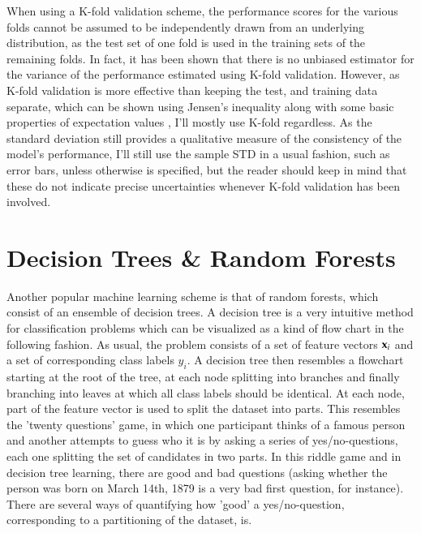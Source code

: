 When using a K-fold validation scheme, the performance scores for the various folds cannot be assumed to be independently drawn from an underlying distribution, as the test set of one fold is used in the training sets of the remaining folds. In fact, it has been shown \cite{Bengio2004} that there is no unbiased estimator for the variance of the performance estimated using K-fold validation. However, as K-fold validation is more effective than keeping the test, and training data separate, which can be shown using Jensen's inequality along with some basic properties of expectation values \cite{Blum1999}, I'll mostly use K-fold regardless. As the standard deviation still provides a qualitative measure of the consistency of the model's performance, I'll still use the sample STD in a usual fashion, such as error bars, unless otherwise is specified, but the reader should keep in mind that these do not indicate precise uncertainties whenever K-fold validation has been involved.

\section{Decision Trees \& Random Forests}
Another popular machine learning scheme is that of random forests, which consist of an ensemble of decision trees.
A decision tree is a very intuitive method for classification problems which can be visualized as a kind of flow chart in the following fashion. As usual, the problem consists of a set of feature vectors $\mathbf{x}_i$ and a set of corresponding class labels $y_i$. A decision tree then resembles a flowchart starting at the root of the tree, at each node splitting into branches and finally branching into leaves at which all class labels should be identical. At each node, part of the feature vector is used to split the dataset into parts. This resembles the 'twenty questions' game, in which one participant thinks of a famous person and another attempts to guess who it is by asking a series of yes/no-questions, each one splitting the set of candidates in two parts. In this riddle game and in decision tree learning, there are good and bad questions (asking whether the person was born on March 14th, 1879 is a very bad first question, for instance). There are several ways of quantifying how 'good' a yes/no-question, corresponding to a partitioning of the dataset, is.


